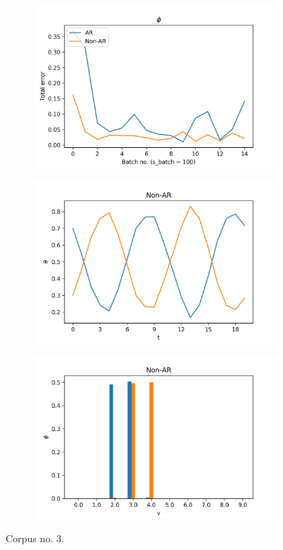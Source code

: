 \documentclass[12pt]{article}
\begin{document}
\begin{figure}[H]
  \begin{subfigure}[b]{0.3\textwidth}
    \includegraphics[width=\linewidth]{performance_phis_experiment-1|overlapping-yes_dataset-3.png}
  \end{subfigure}%
  \begin{subfigure}[b]{0.3\textwidth}
    \includegraphics[width=\linewidth]{latent_thetas_Non-AR_experiment-1|overlapping-yes_dataset-3.png}
  \end{subfigure}%
  \begin{subfigure}[b]{0.3\textwidth}
    \includegraphics[width=\linewidth]{latent_phis_Non-AR_experiment-1|overlapping-yes_dataset-3.png}
  \end{subfigure}%
  \caption{Corpus no. $3$.}
\end{figure}
\end{document}
